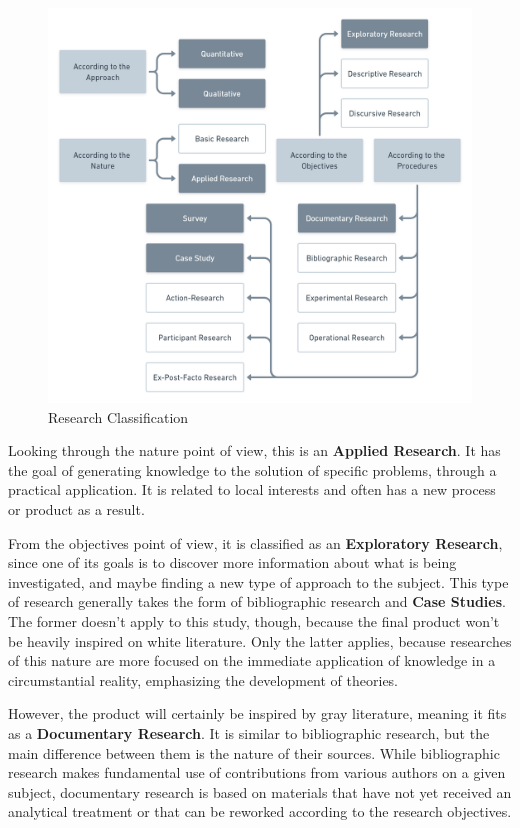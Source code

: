 \begin{figure}[htb]
  \caption{Research Classification}\label{fig:research-classification}
  \begin{center}
    \includegraphics[width=16cm]{img/Research Classification@2x.png}
  \end{center}
\end{figure}

Looking through the nature point of view, this is an \textbf{Applied Research}. It has the goal of generating knowledge to the solution of specific problems, through a practical application. It is related to local interests and often has a new process or product as a result.

From the objectives point of view, it is classified as an \textbf{Exploratory Research}, since one of its goals is to discover more information about what is being investigated, and maybe finding a new type of approach to the subject. This type of research generally takes the form of bibliographic research and \textbf{Case Studies}. The former doesn't apply to this study, though, because the final product won't be heavily inspired on white literature. Only the latter applies, because researches of this nature are more focused on the immediate application of knowledge in a circumstantial reality, emphasizing the development of theories.

However, the product will certainly be inspired by gray literature, meaning it fits as a \textbf{Documentary Research}. It is similar to bibliographic research, but the main difference between them is the nature of their sources. While bibliographic research makes fundamental use of contributions from various authors on a given subject, documentary research is based on materials that have not yet received an analytical treatment or that can be reworked according to the research objectives.

